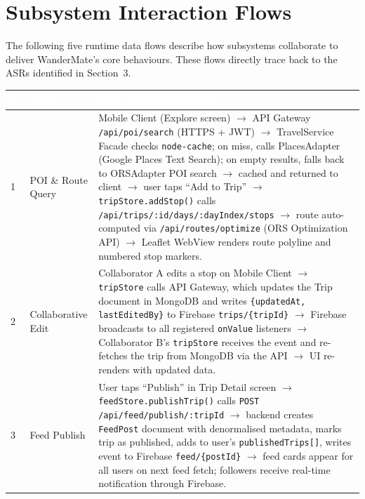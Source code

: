 \documentclass[12pt, a4paper]{article}
\newcommand{\thcell}[1]{\textcolor{white}{\textbf{\small #1}}}
\begin{document}
\section{Subsystem Interaction Flows}

The following five runtime data flows describe how subsystems collaborate to deliver WanderMate's core behaviours. These flows directly trace back to the ASRs identified in Section~3.

\vspace{0.6em}
\begin{longtable}{C{0.5cm} L{3.0cm} L{10.2cm}}
\toprule
{}
\thcell{\#} & \thcell{Flow} & \thcell{Step-by-step Description} \\
\midrule
\endhead
\bottomrule
\endfoot

1 & POI \& Route Query &
Mobile Client (Explore screen) $\rightarrow$ API Gateway \texttt{/api/poi/search} (HTTPS + JWT) $\rightarrow$ TravelService Facade checks \texttt{node-cache}; on miss, calls PlacesAdapter (Google Places Text Search); on empty results, falls back to ORSAdapter POI search $\rightarrow$ cached and returned to client $\rightarrow$ user taps ``Add to Trip'' $\rightarrow$ \texttt{tripStore.addStop()} calls \texttt{/api/trips/:id/days/:dayIndex/stops} $\rightarrow$ route auto-computed via \texttt{/api/routes/optimize} (ORS Optimization API) $\rightarrow$ Leaflet WebView renders route polyline and numbered stop markers. \\

2 & Collaborative Edit &
Collaborator A edits a stop on Mobile Client $\rightarrow$ \texttt{tripStore} calls API Gateway, which updates the Trip document in MongoDB and writes \texttt{\{updatedAt, lastEditedBy\}} to Firebase \texttt{trips/\{tripId\}} $\rightarrow$ Firebase broadcasts to all registered \texttt{onValue} listeners $\rightarrow$ Collaborator B's \texttt{tripStore} receives the event and re-fetches the trip from MongoDB via the API $\rightarrow$ UI re-renders with updated data. \\

3 & Feed Publish &
User taps ``Publish'' in Trip Detail screen $\rightarrow$ \texttt{feedStore.publishTrip()} calls \texttt{POST /api/feed/publish/:tripId} $\rightarrow$ backend creates \texttt{FeedPost} document with denormalised metadata, marks trip as published, adds to user's \texttt{publishedTrips[]}, writes event to Firebase \texttt{feed/\{postId\}} $\rightarrow$ feed cards appear for all users on next feed fetch; followers receive real-time notification through Firebase. \\


\end{longtable}
\end{document}
